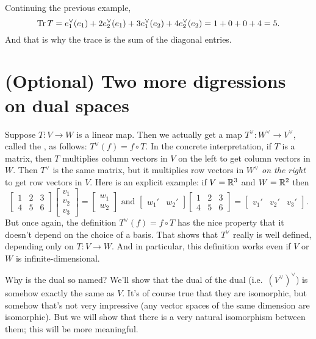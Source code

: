 \begin{example}
	Continuing the previous example,
	\[ \operatorname{Tr} T = e_1^\vee(e_1) + 2e_2^\vee(e_1) 
		+ 3e_1^\vee(e_2) + 4e_2^\vee(e_2)
		= 1 + 0 + 0 + 4 = 5. \]
	And that is why the trace is the sum of the diagonal entries.
\end{example}

\section{(Optional) Two more digressions on dual spaces}
\begin{itemize}
	\ii Suppose $T : V \to W$ is a linear map.
	Then we actually get a map $T^\vee : W^\vee \to V^\vee$,
	called the , as follows:
	$T^\vee(f) = f \circ T$.
	In the concrete interpretation, if $T$ is a matrix, then
	$T$ multiplies column vectors in $V$ on the left to get column vectors in $W$.
	Then $T^\vee$ is the same matrix, but it multiplies
	row vectors in $W^\vee$ \emph{on the right} to get row vectors in $V$.
	Here is an explicit example: if $V = \mathbb R^3$ and $W = \mathbb R^2$ then
	\[
		\begin{bmatrix}
			1 & 2 & 3 \\
			4 & 5 & 6
		\end{bmatrix}
		\begin{bmatrix}
			v_1 \\ v_2 \\ v_3 
		\end{bmatrix}
		= 
		\begin{bmatrix}
			w_1 \\ w_2
		\end{bmatrix} 
		\text{ and }
		\begin{bmatrix}
			w_1' & w_2'
		\end{bmatrix}
		\begin{bmatrix}
			1 & 2 & 3 \\
			4 & 5 & 6
		\end{bmatrix}
		=
		\begin{bmatrix}
			v_1' & v_2' & v_3'
		\end{bmatrix}.
	\]
	But once again, the definition $T^\vee(f) = f \circ T$
	has the nice property that it doesn't depend on the choice of a basis.
	That shows that $T^\vee$ really is well defined, depending only on $T : V \to W$.
	And in particular, this definition works even if $V$ or $W$
	is infinite-dimensional.

	\ii Why is the dual so named?
	We'll show that the dual of the dual (i.e.\ $(V^\vee)^\vee$)
	is somehow exactly the same as $V$.
	It's of course true that they are isomorphic, but somehow that's
	not very impressive (any vector spaces of the same dimension are isomorphic).
	But we will show that there is a very natural isomorphism between them;
	this will be more meaningful.


\end{itemize}
